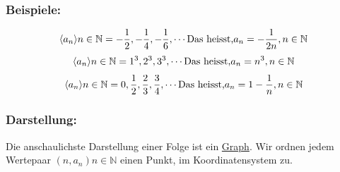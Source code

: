 \documentclass[11pt]{amsart}
\theoremstyle{remark}
\begin{document}
\subsubsection*{Beispiele:}
\begin{equation}
\langle a_n\rangle n\in\mathbb{N} =-\frac{1}{2}, -\frac{1}{4}, -\frac{1}{6}, \dotsb \\\text{Das heisst,} a_n=-\frac{1}{2n} , n \in\mathbb{N}
\end{equation}
\begin{equation}
\langle a_n\rangle n\in\mathbb{N} =1^3, 2^3, 3^3, \dotsb \\\text{Das heisst,} a_n=n^3, n \in\mathbb{N}
\end{equation}
\begin{equation}
\langle a_n\rangle n\in\mathbb{N} =0, \frac 12, \frac 23, \frac 34, \dotsb \\\text{Das heisst,} a_n=1-\frac 1n, n \in\mathbb{N}
\end{equation}
\subsubsection*{Darstellung:}
Die anschaulichste Darstellung einer Folge ist ein \underline{Graph}. Wir ordnen jedem Wertepaar $(n, a_n) n \in\mathbb{N}$ einen Punkt, im Koordinatensystem zu.
\newpage
\end{document}
